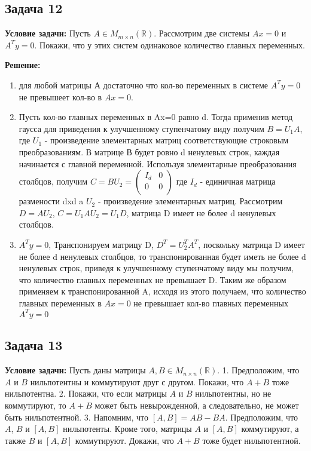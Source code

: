 \documentclass[a4paper,12pt]{article}
\begin{document}
\subsection{Задача 12}
\textbf{Условие задачи:}
Пусть $A \in M_{m \times n}(\mathbb{R})$. Рассмотрим две системы $Ax = 0$ и $A^T y = 0$. Покажи, что у этих систем одинаковое количество главных переменных.

\textbf{Решение: }
\begin{enumerate}
    \item для любой матрицы А достаточно что кол-во переменных в системе $A^Ty=0$ не превышеет кол-во в $Ax=0$. 
    
    \item Пусть кол-во главных переменных в Ax=0 равно d. Тогда применив метод гаусса для приведения к улучшенному ступенчатому виду получим $B=U_1A$, где $U_1$ - произведение элементарных матриц соответствующие строковым преобразованиям. В матрице В будет ровно d ненулевых строк, каждая начинается с главной переменной. Используя элементарные преобразования столбцов, получим 
    $C=BU_2=\begin{pmatrix}
        I_d & 0\\
        0 & 0\\
    \end{pmatrix}$ где $I_d$ - единичная матрица размености dxd a $U_2$ - произведение элементарных матриц. Рассмотрим $D=AU_2$, $C=U_1AU_2=U_1D$, матрица D имеет не более d ненулевых столбцов.
    
    \item $A^Ty=0$, Транспонируем матрицу D, $D^T=U_2^TA^T$, поскольку матрица D имеет не более d ненулевых столбцов, то транспонированная будет иметь не более d ненулевых строк, приведя к улучшенному ступенчатому виду мы получим, что количество главных переменных не превышает D. Таким же образом применяем к транспонированной A, исходя из этого получаем, что количество главных переменных в $Ax = 0$ не превышает кол-во главных переменных $A^T y = 0$
\end{enumerate}

\subsection{Задача 13}
\textbf{Условие задачи:}
Пусть даны матрицы $A, B \in M_{n \times n}(\mathbb{R})$.
1. Предположим, что $A$ и $B$ нильпотентны и коммутируют друг с другом. Покажи, что $A + B$ тоже нильпотентна.
2. Покажи, что если матрицы $A$ и $B$ нильпотентны, но не коммутируют, то $A + B$ может быть невырожденной, а следовательно, не может быть нильпотентной.
3. Напомним, что $[A,B] = AB - BA$. Предположим, что $A$, $B$ и $[A,B]$ нильпотенты. Кроме того, матрицы $A$ и $[A,B]$ коммутируют, а также $B$ и $[A,B]$ коммутируют. Докажи, что $A + B$ тоже будет нильпотентной.
\end{document}
